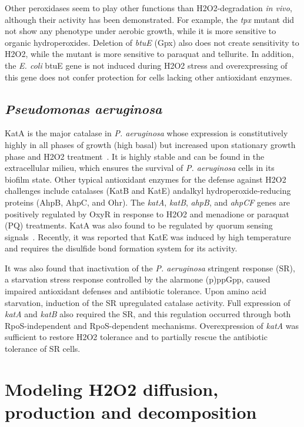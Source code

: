 \documentclass[11pt]{article}
\begin{document}
Other peroxidases seem to play other functions than H2O2-degradation \textit{in vivo}, although their activity has been demonstrated. For example, the \textit{tpx} mutant did not show any phenotype under aerobic growth, while it is more sensitive to organic hydroperoxides. Deletion of \textit{btuE} (Gpx) also does not create sensitivity to H2O2, while the mutant is more sensitive to paraquat and tellurite. In addition, the \textit{E. coli} btuE gene is not induced during H2O2 stress and overexpressing of this gene does not confer protection for cells lacking other antioxidant enzymes.

\subsection{\textit{Pseudomonas aeruginosa}}

KatA is the major catalase in \textit{P. aeruginosa} whose expression is constitutively highly in all phases of growth (high basal) but increased upon stationary growth phase and H2O2 treatment~\cite{heo2010major}. It is highly stable and can be found in the extracellular milieu, which ensures the survival of \textit{P. aeruginosa} cells in its biofilm state. Other typical antioxidant enzymes for the defense against H2O2 challenges include catalases (KatB and KatE) andalkyl hydroperoxide-reducing proteins (AhpB, AhpC, and Ohr). The \textit{katA}, \textit{katB}, \textit{ahpB}, and \textit{ahpCF} genes are positively regulated by OxyR in response to H2O2 and menadione or paraquat (PQ) treatments. KatA was also found to be regulated by quorum sensing signals~\cite{hassett1999quorum}. Recently, it was reported that KatE was induced by high temperature and requires the disulfide bond formation system for its activity.

It was also found that inactivation of the \textit{P. aeruginosa} stringent response (SR), a starvation stress response controlled by the alarmone (p)ppGpp, caused impaired antioxidant defenses and antibiotic tolerance. Upon amino acid starvation, induction of the SR upregulated catalase activity. Full expression of \textit{katA} and \textit{katB} also required the SR, and this regulation occurred through both RpoS-independent and RpoS-dependent mechanisms. Overexpression of \textit{katA} was sufficient to restore H2O2 tolerance and to partially rescue the antibiotic tolerance of SR cells.

\section{Modeling H2O2 diffusion, production and decomposition}
\end{document}
